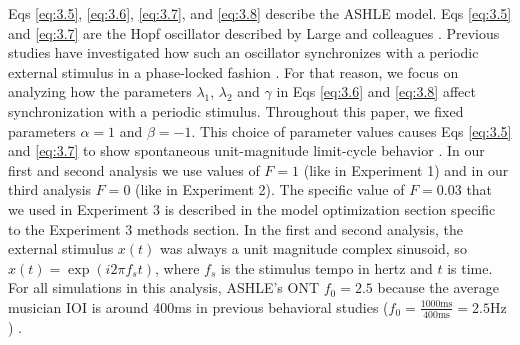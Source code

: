 \documentclass{report}
\begin{document}
Eqs \eqref{eq:3.5}, \eqref{eq:3.6}, \eqref{eq:3.7}, and \eqref{eq:3.8} describe the ASHLE model. Eqs \eqref{eq:3.5} and \eqref{eq:3.7} are the Hopf oscillator described by Large and colleagues \cite{large2010canonical}. Previous studies have investigated how such an oscillator synchronizes with a periodic external stimulus in a phase-locked fashion \cite{kim2015signal}. For that reason, we focus on analyzing how the parameters $\lambda_1$, $\lambda_2$ and $\gamma$ in Eqs \eqref{eq:3.6} and \eqref{eq:3.8} affect synchronization with a periodic stimulus. Throughout this paper, we fixed parameters $\alpha=1$ and $\beta=-1$. This choice of parameter values causes Eqs \eqref{eq:3.5} and \eqref{eq:3.7} to show spontaneous unit-magnitude limit-cycle behavior \cite{kim2015signal}. In our first and second analysis we use values of $F = 1$ (like in Experiment 1) and in our third analysis $F = 0$ (like in Experiment 2). The specific value of $F = 0.03$ that we used in Experiment 3 is described in the model optimization section specific to the Experiment 3 methods section. In the first and second analysis, the external stimulus $x(t)$ was always a unit magnitude complex sinusoid, so $x(t) = \exp(i2\pi f_s t)$, where $f_s$ is the stimulus tempo in hertz and $t$ is time. For all simulations in this analysis, ASHLE's ONT $f_0 = 2.5$ because the average musician IOI is around 400ms in previous behavioral studies ($f_0 = \frac{1000\text{ms}}{400\text{ms}}=2.5\text{Hz}$) \cite{scheurich2018tapping, zamm2018musicians, zamm2016endogenous}.
\end{document}
